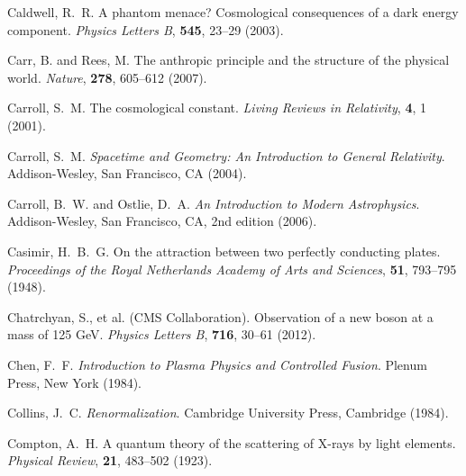 \documentclass[12pt,a4paper]{article}
\begin{document}
\begin{thebibliography}{99}
		Caldwell, R.~R.
		\newblock A phantom menace? Cosmological consequences of a dark energy component.
		\newblock \textit{Physics Letters B}, \textbf{545}, 23--29 (2003).
		\newblock {}
		
		Carr, B. and Rees, M.
		\newblock The anthropic principle and the structure of the physical world.
		\newblock \textit{Nature}, \textbf{278}, 605--612 (2007).
		\newblock {}
		
		Carroll, S.~M.
		\newblock The cosmological constant.
		\newblock \textit{Living Reviews in Relativity}, \textbf{4}, 1 (2001).
		\newblock {}
		
		Carroll, S.~M.
		\newblock \textit{Spacetime and Geometry: An Introduction to General Relativity}.
		\newblock Addison-Wesley, San Francisco, CA (2004).
		
		Carroll, B.~W. and Ostlie, D.~A.
		\newblock \textit{An Introduction to Modern Astrophysics}.
		\newblock Addison-Wesley, San Francisco, CA, 2nd edition (2006).
		
		Casimir, H.~B.~G.
		\newblock On the attraction between two perfectly conducting plates.
		\newblock \textit{Proceedings of the Royal Netherlands Academy of Arts and Sciences}, \textbf{51}, 793--795 (1948).
		
		Chatrchyan, S., et al. (CMS Collaboration).
		\newblock Observation of a new boson at a mass of 125 GeV.
		\newblock \textit{Physics Letters B}, \textbf{716}, 30--61 (2012).
		\newblock {}
		
		Chen, F.~F.
		\newblock \textit{Introduction to Plasma Physics and Controlled Fusion}.
		\newblock Plenum Press, New York (1984).
		
		Collins, J.~C.
		\newblock \textit{Renormalization}.
		\newblock Cambridge University Press, Cambridge (1984).
		
		Compton, A.~H.
		\newblock A quantum theory of the scattering of X-rays by light elements.
		\newblock \textit{Physical Review}, \textbf{21}, 483--502 (1923).
		\newblock {}
		

\end{thebibliography}
\end{document}
